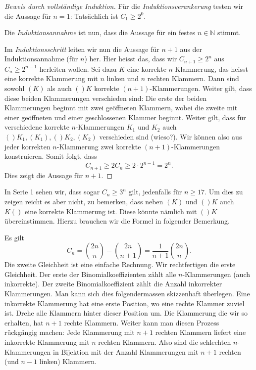\documentclass[../main.tex]{subfiles}
\begin{document}
\begin{proof}[Beweis durch vollständige Induktion]
  Für die \textit{Induktionsverankerung} testen wir die Aussage für $n = 1$:
  Tatsächlich
  ist $C_{1} \geq 2^{0}$.

  Die \textit{Induktionsannahme} ist nun,
  dass die Aussage für ein festes $n \in \mathbb N$ stimmt.

  Im \textit{Induktionsschritt} leiten wir nun die Aussage für $n + 1$
  aus der Induktionsannahme (für $n$) her.
  Hier heisst das, dass wir $C_{n+1} \geq 2^{n}$ aus $C_{n} \geq 2^{n-1}$
  herleiten wollen. Sei dazu $K$ eine korrekte $n$-Klammerung,
  das heisst eine korrekte
  Klammerung mit $n$ linken und $n$ rechten Klammern.
  Dann sind sowohl $(K)$ als auch $()K$ korrekte $(n+1)$-Klammerungen.
  Weiter gilt, dass diese beiden Klammerungen verschieden sind:
  Die erste der beiden Klammerungen beginnt mit zwei geöffneten Klammern,
  wobei die zweite mit einer geöffneten und einer geschlossenen
  Klammer beginnt.
  Weiter gilt, dass für verschiedene
  korrekte $n$-Klammerungen $K_{1}$ und $K_{2}$
  auch $()K_{1}, (K_{1}), ()K_{2}, (K_{2})$ verschieden sind (wieso?).
  Wir können also aus jeder korrekten $n$-Klammerung zwei korrekte
  $(n+1)$-Klammerungen konstruieren. Somit folgt, dass
  \[C_{n+1} \geq 2 C_{n} \geq 2 \cdot 2^{n-1} = 2^{n}.\]
  Dies zeigt die Aussage für $n+ 1$.
\end{proof}

In Serie 1 sehen wir, dass sogar $C_{n} \geq 3^{n}$ gilt,
jedenfalls für $n \geq 17$.
Um dies zu zeigen reicht es aber nicht, zu bemerken,
dass neben $(K)$ und $()K$ auch $K()$ eine korrekte
Klammerung ist. Diese könnte nämlich mit $()K$
übereinstimmen.
Hierzu brauchen wir die Formel in folgender Bemerkung.

\begin{remark}
  Es gilt
  \[
    C_{n} = \binom{2n}{n} - \binom{2n}{n+1} = \frac{1}{n+1}\binom{2n}{n}.
  \]
  Die zweite Gleichheit ist eine einfache Rechnung.
  Wir rechtfertigen die erste Gleichheit.
  Der erste der Binomialkoeffizienten zählt alle $n$-Klammerungen (auch inkorrekte).
  Der zweite Binomialkoeffizient zählt die Anzahl inkorrekter Klammerungen.
  Man kann sich dies folgendermassen skizzenhaft überlegen.
  Eine inkorrekte Klammerung hat eine erste Position,
  wo eine rechte Klammer zuviel ist.
  Drehe alle Klammern hinter dieser Position um.
  Die Klammerung die wir so erhalten, hat $n+1$ rechte Klammern.
  Weiter kann man diesen Prozess rückgängig machen:
  Jede Klammerung mit $n+1$ rechten Klammern
  liefert eine inkorrekte Klammerung mit $n$ rechten Klammern.
  Also sind die schlechten $n$-Klammerungen in Bijektion
  mit der Anzahl Klammerungen mit $n+1$ rechten
  (und $n-1$ linken) Klammern.
\end{remark}
\end{document}
